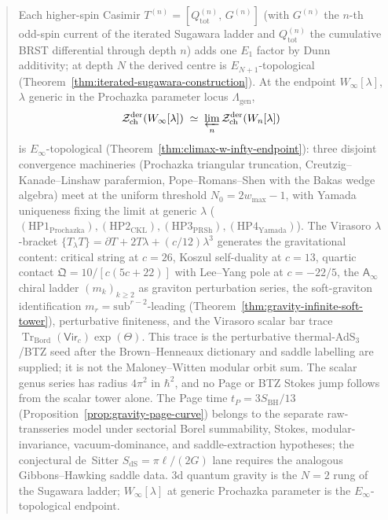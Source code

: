 \documentclass[11pt]{memoir}
\providecommand{\Tr}{\operatorname{Tr}}
\providecommand{\cZ}{\mathcal{Z}}
\newcommand{\Ainf}{\mathsf{A}_{\infty}}
\providecommand{\Vir}{\mathsf{Vir}}
\providecommand{\hypProchazka}{(\mathrm{HP1}_{\mathrm{Prochazka}})}
\providecommand{\hypCKL}{(\mathrm{HP2}_{\mathrm{CKL}})}
\providecommand{\hypPRSh}{(\mathrm{HP3}_{\mathrm{PRSh}})}
\providecommand{\hypYamada}{(\mathrm{HP4}_{\mathrm{Yamada}})}
\begin{document}
\begin{abstract}
Each higher-spin Casimir
$T^{(n)} = [Q_{\mathrm{tot}}^{(n)},\,G^{(n)}]$
(with $G^{(n)}$ the $n$-th odd-spin current of the iterated
Sugawara ladder and $Q_{\mathrm{tot}}^{(n)}$ the cumulative
BRST differential through depth $n$) adds one $E_1$ factor by
Dunn additivity; at depth $N$ the derived centre is
$E_{N+1}$-topological
(Theorem~\ref{thm:iterated-sugawara-construction}). At the
endpoint $W_\infty[\lambda]$, $\lambda$ generic in the Prochazka
parameter locus $\Lambda_{\mathrm{gen}}$,
\[
 \cZ^{\mathrm{der}}_{\mathrm{ch}}(W_\infty[\lambda])
 \;\simeq\;
 \varprojlim_n \cZ^{\mathrm{der}}_{\mathrm{ch}}(W_n[\lambda])
\]
is $E_\infty$-topological
(Theorem~\ref{thm:climax-w-infty-endpoint}): three disjoint
convergence machineries (Prochazka triangular truncation,
Creutzig--Kanade--Linshaw parafermion, Pope--Romans--Shen with the
Bakas wedge algebra) meet at the uniform threshold
$N_0 = 2 w_{\max} - 1$, with Yamada uniqueness fixing the limit at
generic $\lambda$ ($\hypProchazka, \hypCKL, \hypPRSh, \hypYamada$).
The Virasoro $\lambda$-bracket
$\{T_\lambda T\} = \partial T + 2T\lambda + (c/12)\lambda^3$
generates the gravitational content: critical string at $c = 26$,
Koszul self-duality at $c = 13$, quartic contact
$\mathfrak{Q} = 10/[c(5c+22)]$ with Lee--Yang pole at
$c = -22/5$, the $\Ainf$ chiral ladder $(m_k)_{k\ge 2}$ as
graviton perturbation series, the soft-graviton identification
$m_r = \mathrm{sub}^{r-2}$-leading
(Theorem~\ref{thm:gravity-infinite-soft-tower}), perturbative
finiteness, and the Virasoro scalar bar trace
\(\Tr_{\mathrm{Bord}}(\Vir_c)\exp(\Theta)\).  This trace is the
perturbative thermal-AdS$_3$/BTZ seed after the Brown--Henneaux
dictionary and saddle labelling are supplied; it is not the
Maloney--Witten modular orbit sum.  The scalar genus series has
radius \(4\pi^2\) in \(\hbar^2\), and no Page or BTZ Stokes jump
follows from the scalar tower alone.  The Page time
$t_P = 3 S_{\mathrm{BH}}/13$
(Proposition~\ref{prop:gravity-page-curve}) belongs to the separate
raw-transseries model under sectorial Borel summability, Stokes,
modular-invariance, vacuum-dominance, and saddle-extraction
hypotheses; the conjectural de~Sitter
$S_{\mathrm{dS}} = \pi\ell/(2G)$ lane requires the analogous
Gibbons--Hawking saddle data.
3d quantum gravity is the $N = 2$ rung of the Sugawara ladder;
$W_\infty[\lambda]$ at generic Prochazka parameter is the
$E_\infty$-topological endpoint.


\end{abstract}
\end{document}
